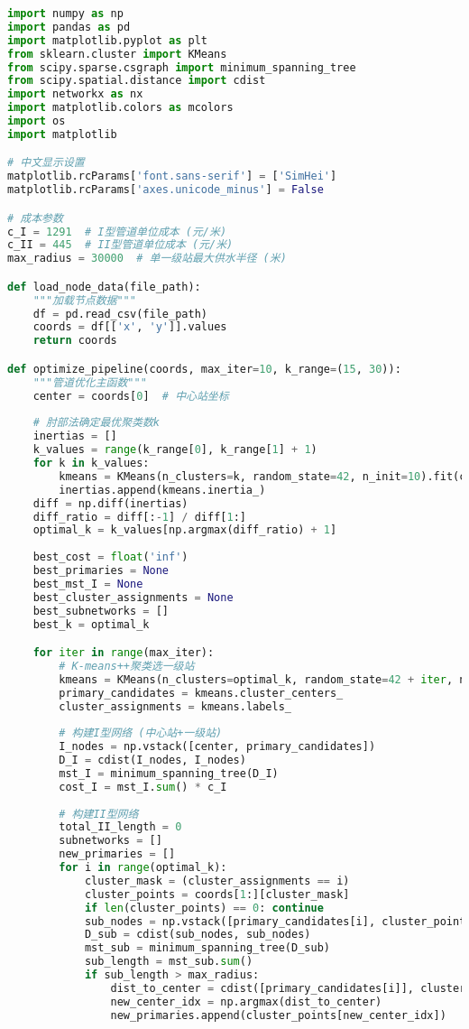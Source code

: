 \documentclass[12pt,a4paper]{article}
\begin{document}
\begin{lstlisting}[language=Python]
import numpy as np
import pandas as pd
import matplotlib.pyplot as plt
from sklearn.cluster import KMeans
from scipy.sparse.csgraph import minimum_spanning_tree
from scipy.spatial.distance import cdist
import networkx as nx
import matplotlib.colors as mcolors
import os
import matplotlib

# 中文显示设置
matplotlib.rcParams['font.sans-serif'] = ['SimHei']
matplotlib.rcParams['axes.unicode_minus'] = False

# 成本参数
c_I = 1291  # I型管道单位成本 (元/米)
c_II = 445  # II型管道单位成本 (元/米)
max_radius = 30000  # 单一级站最大供水半径 (米)

def load_node_data(file_path):
    """加载节点数据"""
    df = pd.read_csv(file_path)
    coords = df[['x', 'y']].values
    return coords

def optimize_pipeline(coords, max_iter=10, k_range=(15, 30)):
    """管道优化主函数"""
    center = coords[0]  # 中心站坐标
    
    # 肘部法确定最优聚类数k
    inertias = []
    k_values = range(k_range[0], k_range[1] + 1)
    for k in k_values:
        kmeans = KMeans(n_clusters=k, random_state=42, n_init=10).fit(coords[1:])
        inertias.append(kmeans.inertia_)
    diff = np.diff(inertias)
    diff_ratio = diff[:-1] / diff[1:]
    optimal_k = k_values[np.argmax(diff_ratio) + 1]
    
    best_cost = float('inf')
    best_primaries = None
    best_mst_I = None
    best_cluster_assignments = None
    best_subnetworks = []
    best_k = optimal_k

    for iter in range(max_iter):
        # K-means++聚类选一级站
        kmeans = KMeans(n_clusters=optimal_k, random_state=42 + iter, n_init=10).fit(coords[1:])
        primary_candidates = kmeans.cluster_centers_
        cluster_assignments = kmeans.labels_
        
        # 构建I型网络 (中心站+一级站)
        I_nodes = np.vstack([center, primary_candidates])
        D_I = cdist(I_nodes, I_nodes)
        mst_I = minimum_spanning_tree(D_I)
        cost_I = mst_I.sum() * c_I
        
        # 构建II型网络
        total_II_length = 0
        subnetworks = []
        new_primaries = []
        for i in range(optimal_k):
            cluster_mask = (cluster_assignments == i)
            cluster_points = coords[1:][cluster_mask]
            if len(cluster_points) == 0: continue
            sub_nodes = np.vstack([primary_candidates[i], cluster_points])
            D_sub = cdist(sub_nodes, sub_nodes)
            mst_sub = minimum_spanning_tree(D_sub)
            sub_length = mst_sub.sum()
            if sub_length > max_radius:
                dist_to_center = cdist([primary_candidates[i]], cluster_points)[0]
                new_center_idx = np.argmax(dist_to_center)
                new_primaries.append(cluster_points[new_center_idx])
        

\end{lstlisting}
\end{document}

